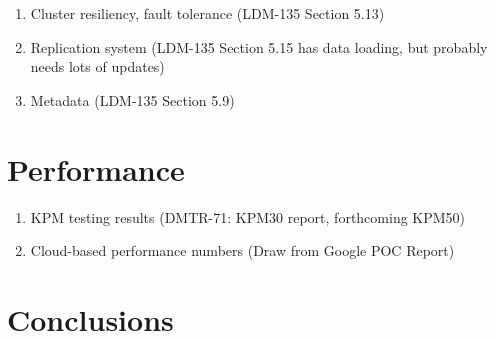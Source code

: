 \begin{enumerate}
    \item Cluster resiliency, fault tolerance (LDM-135 Section 5.13)
    \item Replication system (LDM-135 Section 5.15 has data loading, but probably needs lots of updates)
    \item Metadata (LDM-135 Section 5.9)
\end{enumerate}

\section{Performance}

\begin{enumerate}
    \item KPM testing results (DMTR-71: KPM30 report, forthcoming KPM50)
    \item Cloud-based performance numbers (Draw from Google POC Report)
\end{enumerate}


\section{Conclusions}



